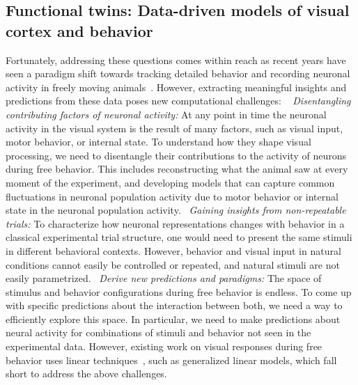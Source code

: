 \documentclass[B2,COG]{ercgrant}
\begin{document}
\subsection{Functional twins: Data-driven models of visual cortex and behavior} 
Fortunately, addressing these questions comes within reach as recent years have seen a paradigm shift towards tracking detailed behavior and recording neuronal activity in freely moving animals~\parencite{Wallace2013-lf,Del_Grosso2017-ww,Mathis2018-lk,Cai2016-rh, Parker2022-ac}.
However, extracting meaningful insights and predictions from these data poses new computational challenges: ~
\textit{Disentangling contributing factors of neuronal activity:}
At any point in time the neuronal activity in the visual system is the result of many factors, such as visual input, motor behavior, or internal state. 
To understand how they shape visual processing, we need to disentangle their contributions to the activity of neurons during free behavior. 
This includes reconstructing what the animal saw at every moment of the experiment, and developing models that can capture common fluctuations in neuronal population activity due to motor behavior or internal state in the neuronal population activity.
~\textit{Gaining insights from non-repeatable trials:} 
To characterize how neuronal representations changes with behavior in a classical experimental trial structure, one would need to present the same stimuli in different behavioral contexts. 
However, behavior and visual input in natural conditions cannot easily be controlled or repeated, and natural stimuli are not easily parametrized.
~\textit{Derive new predictions and paradigms:} The space of stimulus and behavior configurations during free behavior is endless.
To come up with specific predictions about the interaction between both, we need a way to efficiently explore this space. 
In particular, we need to make predictions about neural activity for combinations of stimuli and behavior not seen in the experimental data.
However, existing work on visual responses during free behavior uses linear techniques~\parencite{Parker2022-ac}, such as generalized linear models, which fall short to address the above challenges.
\end{document}
